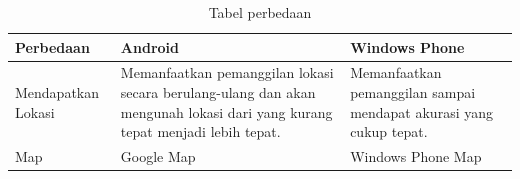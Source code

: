 \begin{table}[h]
	\centering
		\begin{tabular}{|p{4cm}|p{4cm}|p{4cm}|}\hline
				Perbedaan & Android & Windows Phone \\ \hline
				Mendapatkan Lokasi & Memanfaatkan pemanggilan lokasi secara berulang-ulang dan akan mengunah lokasi dari yang kurang tepat menjadi lebih tepat. & Memanfaatkan pemanggilan sampai mendapat akurasi yang cukup tepat. \\ \hline
				Map  & Google Map & Windows Phone Map \\ \hline
		\end{tabular}
	\caption{Tabel perbedaan}
	\label{tab:TabelPerbedaan}
\end{table}